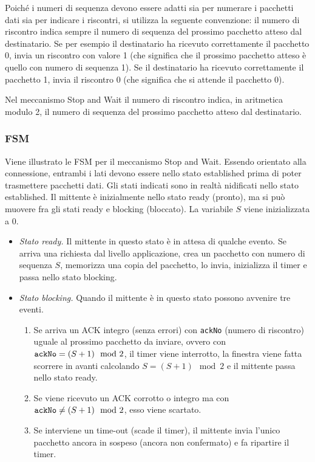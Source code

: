 Poiché i numeri di sequenza devono essere adatti sia per numerare i pacchetti dati sia per indicare i riscontri, si utilizza la seguente convenzione: il numero di riscontro indica sempre il numero di sequenza del prossimo pacchetto atteso dal destinatario. Se per esempio il destinatario ha ricevuto correttamente il pacchetto 0, invia un riscontro con valore 1 (che significa che il prossimo pacchetto atteso è quello con numero di sequenza 1). Se il destinatario ha ricevuto correttamente il pacchetto 1, invia il riscontro 0 (che significa che si attende il pacchetto 0).

Nel meccanismo Stop and Wait il numero di riscontro indica, in aritmetica modulo 2, il numero di sequenza del prossimo pacchetto atteso dal destinatario.

\subsubsection*{FSM}
Viene illustrato le FSM per il meccanismo Stop and Wait. Essendo orientato alla connessione, entrambi i lati devono essere nello stato established prima di poter trasmettere pacchetti dati. Gli stati indicati sono in realtà nidificati nello stato established. Il mittente è inizialmente nello stato ready (pronto), ma si può muovere fra gli stati ready e blocking (bloccato). La variabile $S$ viene inizializzata a 0.
\begin{itemize}
    \item \textit{Stato ready.} Il mittente in questo stato è in attesa di qualche evento. Se arriva una richiesta dal livello applicazione, crea un pacchetto con numero di sequenza $S$, memorizza una copia del pacchetto, lo invia, inizializza il timer e passa nello stato blocking.
    \item \textit{Stato blocking.} Quando il mittente è in questo stato possono avvenire tre eventi.
    \begin{enumerate}
        \item Se arriva un ACK integro (senza errori) con \verb|ackNo| (numero di riscontro) uguale al prossimo pacchetto da inviare, ovvero con $\verb|ackNo| = (S +1) \mod 2$, il timer viene interrotto, la finestra viene fatta scorrere in avanti calcolando $S = (S + 1) \mod 2$ e il mittente passa nello stato ready.
        \item Se viene ricevuto un ACK corrotto o integro ma con $\verb|ackNo|\neq (S + 1) \mod 2$, esso viene scartato.
        \item Se interviene un time-out (scade il timer), il mittente invia l'unico pacchetto ancora in sospeso (ancora non confermato) e fa ripartire il timer.
    \end{enumerate}
\end{itemize}

